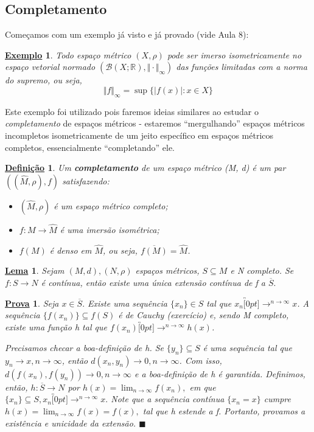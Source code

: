 \documentclass{article}
\newtheorem*{def*}{\underline{Defini\c c\~ao}}
\newtheorem*{lemma*}{\underline{Lema}}
\newtheorem{example}{\underline{Exemplo}}
\newtheorem*{proof*}{\underline{Prova}}
\renewcommand\qedsymbol{$\blacksquare$}
\begin{document}
\subsection{Completamento}
  Começamos com um exemplo já visto e já provado (vide Aula 8):
\begin{example}
  Todo espaço métrico \((X, \rho )\) pode ser imerso isometricamente no espaço vetorial normado \((\mathcal{B}(X;\mathbb{R}), \Vert \cdot \Vert_{\infty})\) das funções
limitadas com a norma do supremo, ou seja, 
  \[
    \Vert f \Vert_{\infty} = \sup\{|f(x)|: x\in X\}
  \]
\end{example}
  Este exemplo foi utilizado pois faremos ideias similares ao estudar o \textit{completamento} de espaços métricos - estaremos ``mergulhando'' espaços métricos incompletos
isometricamente de um jeito específico em espaços métricos completos, essencialmente ``completando'' ele.
\begin{def*}
  Um \textbf{completamento} de um espaço métrico (M, d) é um par \(((\hat{M}, \rho ), f)\) satisfazendo:
\begin{itemize}
  \item[i)] \((\hat{M}, \rho )\) é um espaço métrico completo;
  \item[ii)] \(f:M\rightarrow \hat{M}\) é uma imersão isométrica;
  \item[iii)] \(f(M)\) é denso em \(\hat{M}\), ou seja, \(\overline{f(M)} = \hat{M}\).
\end{itemize}
\end{def*}
\begin{lemma*}
  Sejam \((M, d), (N, \rho )\) espaços métricos, \(S\subseteq{M}\) e N completo. Se \(f:S\rightarrow N\) é contínua, então existe uma única extensão contínua de f a \(\overline{S}.\)
\end{lemma*}
\begin{proof*}
  Seja \(x\in \overline{S}.\) Existe uma sequência \(\{x_{n}\}\in S\) tal que \(x_{n}\overbracket[0pt]{\longrightarrow}^{n\to \infty}x\). A sequência \(\{f(x_{n})\}\subseteq{f(S)}\)
é de Cauchy (exercício) e, sendo M completo, existe uma função h tal que \(f(x_{n})\overbracket[0pt]{\longrightarrow}^{n\to \infty}h(x)\). 

  Precisamos checar a boa-definição de h. Se \(\{y_{n}\}\subseteq{S}\) é uma sequência tal que \(y_{n}\longrightarrow x, n\rightarrow \infty\), então \(d(x_{n}, y_{n})\longrightarrow 0, n\rightarrow \infty\).
Com isso, \(d(f(x_{n}), f(y_{n}))\longrightarrow 0, n\rightarrow \infty\) e a boa-definição de h é garantida. Definimos, então, \(h:\overline{S}\rightarrow N\) por
 \(h(x) = \lim_{n\to \infty}f(x_{n}),\) em que \(\{x_{n}\}\subseteq{S}, x_{n}\overbracket[0pt]{\longrightarrow}^{n\to \infty}x.\) Note que a sequência contínua
  \(\{x_{n} = x\}\) cumpre \(h(x) = \lim_{n\to \infty}f(x) = f(x),\) tal que h estende a f. Portanto, provamos a existência e unicidade da extensão. \qedsymbol
\end{proof*}
\end{document}
